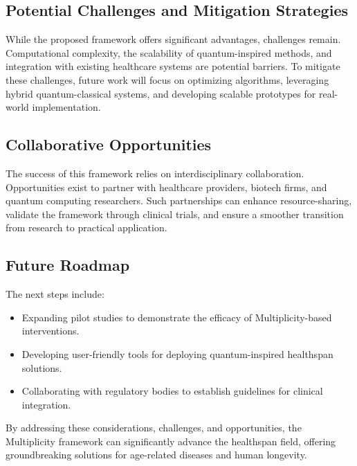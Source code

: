 \documentclass{article}
\theoremstyle{plain}
\begin{document}
\subsection{Potential Challenges and Mitigation Strategies}
While the proposed framework offers significant advantages, challenges remain. Computational complexity, the scalability of quantum-inspired methods, and integration with existing healthcare systems are potential barriers. To mitigate these challenges, future work will focus on optimizing algorithms, leveraging hybrid quantum-classical systems, and developing scalable prototypes for real-world implementation.

\subsection{Collaborative Opportunities}
The success of this framework relies on interdisciplinary collaboration. Opportunities exist to partner with healthcare providers, biotech firms, and quantum computing researchers. Such partnerships can enhance resource-sharing, validate the framework through clinical trials, and ensure a smoother transition from research to practical application.

\subsection{Future Roadmap}
The next steps include:
\begin{itemize}
    \item Expanding pilot studies to demonstrate the efficacy of Multiplicity-based interventions.
    \item Developing user-friendly tools for deploying quantum-inspired healthspan solutions.
    \item Collaborating with regulatory bodies to establish guidelines for clinical integration.
\end{itemize}

By addressing these considerations, challenges, and opportunities, the Multiplicity framework can significantly advance the healthspan field, offering groundbreaking solutions for age-related diseases and human longevity.






\end{document}
